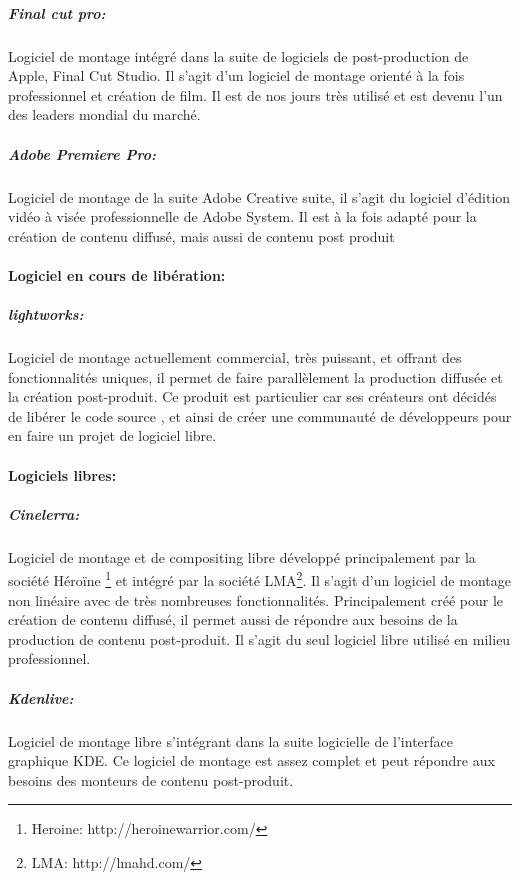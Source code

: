 \subparagraph{Final cut pro:}

Logiciel de montage intégré dans la suite de logiciels de
post-production de Apple, Final Cut Studio. Il s'agit d'un logiciel
de montage orienté à la fois professionnel et création de film. Il
est de nos jours très utilisé et est devenu l'un des leaders mondial
du marché.

\subparagraph{Adobe Premiere Pro:}

Logiciel de montage de la suite Adobe Creative suite, il s'agit du
logiciel d'édition vidéo à visée professionnelle de Adobe System. Il
est à la fois adapté pour la création de contenu diffusé, mais aussi
de contenu post produit

\paragraph {Logiciel en cours de libération:}

\subparagraph{lightworks:}

Logiciel de montage actuellement commercial, très puissant, et offrant
des fonctionnalités uniques, il permet de faire parallèlement la
production diffusée et la création post-produit. Ce produit est
particulier car ses créateurs ont décidés de libérer le code source
\cite{TheLightworksOpenSourceProjectStartHere}, et ainsi  de créer une
communauté de développeurs pour en faire un projet de logiciel libre.

\paragraph {Logiciels libres:}

\subparagraph{Cinelerra:}

Logiciel de montage et de compositing libre développé principalement
par la société Héroïne \footnote{Heroine: http://heroinewarrior.com/}
et intégré par la société LMA\footnote{LMA: http://lmahd.com/}. Il
s'agit d'un logiciel de montage non linéaire avec de très nombreuses
fonctionnalités. Principalement créé pour le création de contenu
diffusé, il permet aussi de répondre aux besoins de la production
de contenu post-produit. Il s'agit du seul logiciel libre utilisé en
milieu professionnel.

\subparagraph{Kdenlive:}

Logiciel de montage libre s'intégrant dans la suite logicielle de
l'interface graphique KDE.  Ce logiciel de montage est assez complet et
peut répondre aux besoins des monteurs de contenu post-produit.

